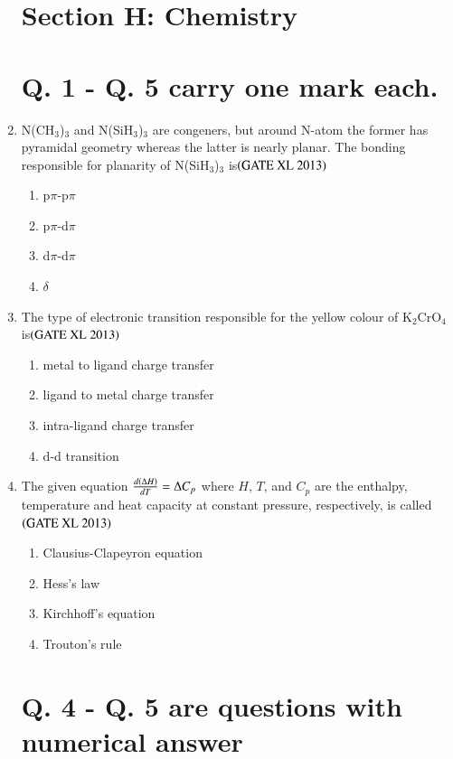 \documentclass[journal]{IEEEtran}
\begin{document}
\begin{enumerate}
\clearpage\section*{Section H: Chemistry}
\section*{Q. 1 - Q. 5 carry one mark each.}

\item N(CH$_3$)$_3$ and N(SiH$_3$)$_3$ are congeners, but around N-atom the former has pyramidal geometry whereas the latter is nearly planar. The bonding responsible for planarity of N(SiH$_3$)$_3$ is\hfill $\left(\text{GATE XL 2013}\right)$
\begin{enumerate}
    \item p$\pi$-p$\pi$
    \item p$\pi$-d$\pi$
    \item d$\pi$-d$\pi$
    \item $\delta$
\end{enumerate}

\item The type of electronic transition responsible for the yellow colour of K$_2$CrO$_4$ is\hfill $\left(\text{GATE XL 2013}\right)$
\begin{enumerate}
    \item metal to ligand charge transfer
    \item ligand to metal charge transfer
    \item intra-ligand charge transfer
    \item d-d transition
\end{enumerate}

\item The given equation $\frac{d\left(\Delta H\right)}{dT} = \Delta C_p$ where $H$, $T$, and $C_p$ are the enthalpy, temperature and heat capacity at constant pressure, respectively, is called\hfill $\left(\text{GATE XL 2013}\right)$
\begin{enumerate}
    \item Clausius-Clapeyron equation
    \item Hess's law
    \item Kirchhoff's equation
    \item Trouton's rule
\end{enumerate}

\section*{Q. 4 - Q. 5 are questions with numerical answer}


\end{enumerate}
\end{document}
